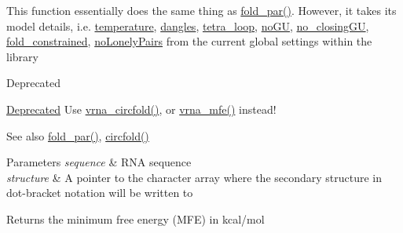 This function essentially does the same thing as \hyperlink{group__mfe__fold__single_ga2bc41df5d71fee6fd8da9904ee65d8fb}{fold\+\_\+par()}. However, it takes its model details, i.\+e. \hyperlink{group__model__details_gab4b11c8d9c758430960896bc3fe82ead}{temperature}, \hyperlink{group__model__details_ga72b511ed1201f7e23ec437e468790d74}{dangles}, \hyperlink{group__model__details_ga4f6265bdf0ead7ff4628a360adbfd77e}{tetra\+\_\+loop}, \hyperlink{group__model__details_gabf380d09e4f1ab94fc6af57cf0ad5d32}{no\+GU}, \hyperlink{group__model__details_gaa8d1c7b92489179e1eafa562b7bdd259}{no\+\_\+closing\+GU}, \hyperlink{fold__vars_8h_a0afc287c2464866d94858c39175154af}{fold\+\_\+constrained}, \hyperlink{group__model__details_ga097eccaabd6ae8b4fef83cccff85bb5d}{no\+Lonely\+Pairs} from the current global settings within the library

\begin{DoxyRefDesc}{Deprecated}
\item[\hyperlink{deprecated__deprecated000070}{Deprecated}]Use \hyperlink{group__mfe__fold__single_gaf973483d8acbc8cc9aacfc8a9b7f0074}{vrna\+\_\+circfold()}, or \hyperlink{group__mfe__fold_gabd3b147371ccf25c577f88bbbaf159fd}{vrna\+\_\+mfe()} instead!\end{DoxyRefDesc}


\begin{DoxySeeAlso}{See also}
\hyperlink{group__mfe__fold__single_ga2bc41df5d71fee6fd8da9904ee65d8fb}{fold\+\_\+par()}, \hyperlink{group__mfe__fold__single_ga4ac63ab3e8d9a80ced28b8052d94e423}{circfold()}
\end{DoxySeeAlso}

\begin{DoxyParams}{Parameters}
{\em sequence} & R\+NA sequence \\
\hline
{\em structure} & A pointer to the character array where the secondary structure in dot-\/bracket notation will be written to \\
\hline
\end{DoxyParams}
\begin{DoxyReturn}{Returns}
the minimum free energy (M\+FE) in kcal/mol 
\end{DoxyReturn}
\mbox{\label{group__mfe__fold__single_ga107fdfe5fd641868156bfd849f6866c7}} 
